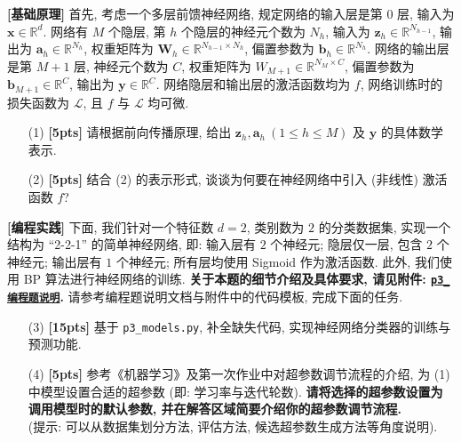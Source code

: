 \documentclass[a4paper,UTF8]{article}
\numberwithin{equation}{section}
\theoremstyle{definition}
\begin{document}
\textbf{[基础原理]} 首先, 考虑一个多层前馈神经网络, 规定网络的输入层是第 $0$ 层, 输入为 $\mathbf{x} \in \mathbb{R}^d$. 网络有 $M$ 个隐层, 第 $h$ 个隐层的神经元个数为 $N_h$, 输入为 $\mathbf{z}_h\in \mathbb{R}^{N_{h-1}}$, 输出为 $\mathbf{a}_h \in \mathbb{R}^{N_h}$, 权重矩阵为 $\mathbf{W}_h \in \mathbb{R}^{N_{h-1} \times N_{h}}$, 偏置参数为 $\mathbf{b}_h \in \mathbb{R}^{N_h}$. 网络的输出层是第 $M+1$ 层, 神经元个数为 $C$, 权重矩阵为 $W_{M+1} \in \mathbb{R}^{N_M \times C}$, 偏置参数为 $\mathbf{b}_{M+1} \in \mathbb{R}^C$, 输出为 $\mathbf{y} \in \mathbb{R}^C$. 网络隐层和输出层的激活函数均为 $f$, 网络训练时的损失函数为 $\mathcal{L}$, 且 $f$ 与 $\mathcal{L}$ 均可微.

\begin{enumerate}
    \item [(1)] \textbf{[5pts]} 请根据前向传播原理, 给出 $\mathbf{z}_h, \mathbf{a}_h\ (1\leq h \leq M)$ 及 $\mathbf{y}$ 的具体数学表示.
    \item [(2)] \textbf{[5pts]} 结合 (2) 的表示形式, 谈谈为何要在神经网络中引入 (非线性) 激活函数 $f$?
\end{enumerate}

\textbf{[编程实践]} 下面, 我们针对一个特征数 $d=2$, 类别数为 $2$ 的分类数据集, 实现一个结构为 ``2-2-1'' 的简单神经网络, 即: 输入层有 $2$ 个神经元; 隐层仅一层, 包含 $2$ 个神经元; 输出层有 $1$ 个神经元; 所有层均使用 Sigmoid 作为激活函数. 此外, 我们使用 BP 算法进行神经网络的训练. \textbf{关于本题的细节介绍及具体要求, 请见附件: \href{https://www.lamda.nju.edu.cn/ML2024Spring/homework/HW3/p3_guide.pdf}{\texttt{p3\hspace{0em}\_\hspace{0em}编程题说明}}.} 请参考编程题说明文档与附件中的代码模板, 完成下面的任务.

\begin{enumerate}
    \item [(3)] \textbf{[15pts]} 基于 \texttt{p3\_models.py}, 补全缺失代码, 实现神经网络分类器的训练与预测功能.
    \item [(4)] \textbf{[5pts]} 参考《机器学习》及第一次作业中对超参数调节流程的介绍, 为 (1) 中模型设置合适的超参数 (即: 学习率与迭代轮数). \textbf{请将选择的超参数设置为调用模型时的默认参数, 并在解答区域简要介绍你的超参数调节流程.}\\(提示: 可以从数据集划分方法, 评估方法, 候选超参数生成方法等角度说明).
\end{enumerate}
\end{document}
